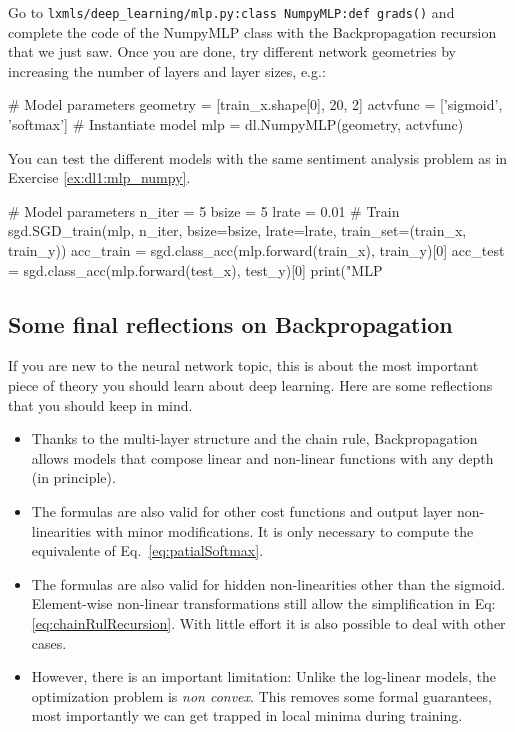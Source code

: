 \begin{exercise}\label{ex:dl1:grads}
Go to \texttt{lxmls/deep\_learning/mlp.py:class NumpyMLP:def grads()} and complete the
code of the NumpyMLP class with the Backpropagation recursion that we just saw.
Once you are done, try different network geometries by increasing the number of
layers and layer sizes, e.g.:
\begin{python}
# Model parameters
geometry = [train_x.shape[0], 20, 2]
actvfunc = ['sigmoid', 'softmax'] 
# Instantiate model
mlp      = dl.NumpyMLP(geometry, actvfunc) 
\end{python}
You can test the different models with the same sentiment analysis problem as
in Exercise \ref{ex:dl1:mlp_numpy}.
\begin{python}
# Model parameters
n_iter = 5
bsize  = 5
lrate  = 0.01
# Train
sgd.SGD_train(mlp, n_iter, bsize=bsize, lrate=lrate, train_set=(train_x, train_y))
acc_train = sgd.class_acc(mlp.forward(train_x), train_y)[0]
acc_test  = sgd.class_acc(mlp.forward(test_x), test_y)[0]
print("MLP %
\end{python}
\end{exercise}


\subsection{Some final reflections on Backpropagation}

If you are new to the neural network topic, this is about the most important
piece of theory you should learn about deep learning. Here are some reflections
that you should keep in mind.

\begin{itemize}
\item Thanks to the multi-layer structure and the chain rule, Backpropagation allows models that compose linear and non-linear functions with any depth (in principle\footnotemark). 

\item The formulas are also valid for other cost functions and output layer non-linearities with minor modifications. It is only necessary to compute the equivalente of Eq.~\ref{eq:patialSoftmax}. 

\item The formulas are also valid for hidden non-linearities other than the sigmoid. Element-wise non-linear transformations still allow the simplification in Eq: \ref{eq:chainRulRecursion}. With little effort it is also possible to deal with other cases.

\item However, there is an important limitation: Unlike the log-linear models, the optimization problem is \textit{non convex}. This removes some formal guarantees, most importantly we can get trapped in local minima during training.
\end{itemize}

